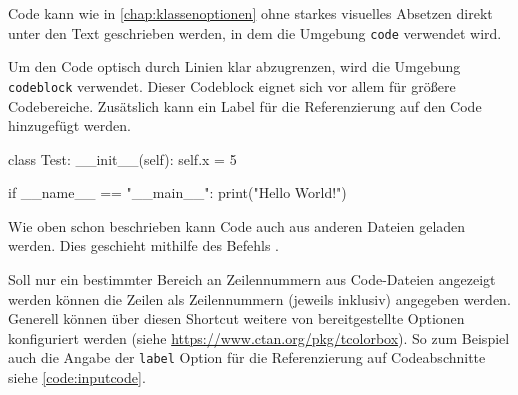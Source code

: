 Code kann wie in \autoref{chap:klassenoptionen} ohne starkes visuelles Absetzen direkt unter den Text geschrieben werden, in dem die Umgebung \texttt{code} verwendet wird.


Um den Code optisch durch Linien klar abzugrenzen, wird die Umgebung \texttt{codeblock} verwendet. Dieser Codeblock eignet sich vor allem für größere Codebereiche. Zusätslich kann ein Label für die Referenzierung auf den Code hinzugefügt werden.

\begin{code}[latex]
    \begin{codeblock}[python,label={code:python-class}]
        class Test:
            __init__(self):
                self.x = 5

        if __name__ == "__main__":
            print("Hello World!")
    \end{codeblock}
\end{code}

Wie oben schon beschrieben kann Code auch aus anderen Dateien geladen werden. Dies geschieht mithilfe des Befehls \texttt{}.

\begin{code}[latex]
\end{code}


Soll nur ein bestimmter Bereich an Zeilennummern aus Code-Dateien angezeigt werden können die Zeilen als Zeilennummern (jeweils inklusiv) angegeben werden. Generell können über diesen Shortcut weitere von \texttt{\NewTCBInputListing} bereitgestellte Optionen konfiguriert werden (siehe \url{https://www.ctan.org/pkg/tcolorbox}). So zum Beispiel auch die Angabe der \texttt{label} Option für die Referenzierung auf Codeabschnitte siehe \autoref{code:inputcode}. 

\begin{code}[latex]
\end{code}

